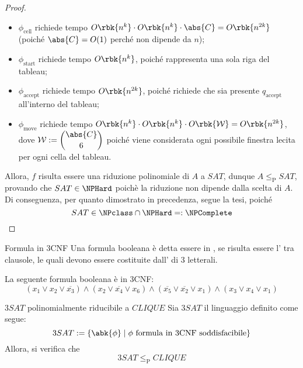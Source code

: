 \documentclass[a4paper, 12pt]{report}
\begin{document}
\begin{proof}
        \begin{itemize}
            \item $\phi_\mathrm{cell}$ richiede tempo $O\rbk{n^k} \cdot O\rbk{n^k} \cdot \abs{C} = O\rbk{n^{2k}}$ (poiché $\abs{C} = O(1)$ perché non dipende da $n$);
            \item $\phi_\mathrm{start}$ richiede tempo $O\rbk{n^k}$, poiché rappresenta una sola riga del tableau;
            \item $\phi_\mathrm{accept}$ richiede tempo $O\rbk{n^{2k}}$, poiché richiede che sia presente $q_\mathrm{accept}$ all'interno del tableau;
            \item $\phi_\mathrm{move}$ richiede tempo $O\rbk{n^{k}} \cdot O\rbk{n^k} \cdot O\rbk{\mathcal W} = O\rbk{n^{2k}}$, dove $\mathcal W := \displaystyle \binom{\abs{C}}{6}$ poiché viene considerata ogni possibile finestra lecita per ogni cella del tableau.
        \end{itemize}

        Allora, $f$ risulta essere una riduzione polinomiale di $A$ a $SAT$, dunque $A \leq_\mathrm P SAT$, provando che $SAT \in \NPHard$ poichè la riduzione non dipende dalla scelta di $A$. Di conseguenza, per quanto dimostrato in precedenza, segue la tesi, poiché $$SAT \in \NPclass \cap \NPHard =: \NPComplete$$
    \end{proof}

    \begin{frameddefn}{Formula in 3CNF}
        Una formula booleana è detta essere in , se risulta essere l' tra clausole, le quali devono essere costituite dall' di 3 letterali.
    \end{frameddefn}

    \begin{example}
        La seguente formula booleana è in 3CNF: $$(x_1 \lor x_2 \lor \overline{x_3}) \land (x_2 \lor \overline{x_4} \lor x_6) \land (\overline{x_5} \lor \overline{x_2} \lor x_1) \land (x_3 \lor x_4 \lor x_1)$$
    \end{example}

    \begin{framedthm}[label={3sat red clique}]{$3SAT$ polinomialmente riducibile a $CLIQUE$}
        Sia $3SAT$ il linguaggio definito come segue: $$3SAT := \{\abk{\phi} \mid \phi \ \textrm{formula in 3CNF soddisfacibile}\}$$ Allora, si verifica che $$3SAT \leq_\mathrm P CLIQUE$$
    \end{framedthm}
\end{document}
